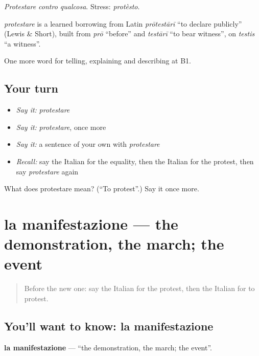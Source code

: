 \emph{Protestare contro qualcosa}. Stress: \emph{protèsto}.

\begin{cousinweb}
\emph{protestare} is a learned borrowing from Latin \emph{prōtestārī} \textquotedblleft{}to declare publicly\textquotedblright{} (Lewis \& Short), built from \emph{prō} \textquotedblleft{}before\textquotedblright{} and \emph{testārī} \textquotedblleft{}to bear witness\textquotedblright{}, on \emph{testis} \textquotedblleft{}a witness\textquotedblright{}.
\end{cousinweb}

\begin{grammarlens}[title={What you've built}]
One more word for telling, explaining and describing at B1.
\end{grammarlens}

\subsection*{Your turn}
\begin{itemize}
\raggedright
  \item \emph{Say it:} \emph{protestare}
  \item \emph{Say it:} \emph{protestare}, once more
  \item \emph{Say it:} a sentence of your own with \emph{protestare}
  \item \emph{Recall:} say the Italian for the equality, then the Italian for the protest, then say \emph{protestare} again
\end{itemize}

\begin{tcolorbox}[breakable,colback=teal!4,colframe=teal!35!black,title={Before you move on}]
What does protestare mean? (\textquotedblleft{}To protest\textquotedblright{}.) Say it once more.
\end{tcolorbox}
\section[la manifestazione]{la manifestazione — the demonstration, the march; the event}

\label{lesson:IT-C364-manifestazione}



\begin{quote}
Before the new one: say the Italian for the protest, then the Italian for to protest.
\end{quote}

\subsection*{You'll want to know: la manifestazione}
\textbf{la manifestazione} — \textquotedblleft{}the demonstration, the march; the event\textquotedblright{}.

